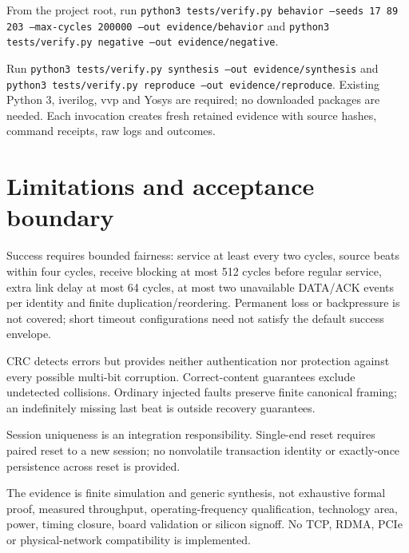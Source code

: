 \documentclass[11pt,a4paper]{article}
\begin{document}
From the project root,\allowbreak{} run \texttt{python3 tests/\allowbreak{}verify.py behavior --seeds 17 89 203 --max-cycles 200000 --out evidence/\allowbreak{}behavior} and \texttt{python3 tests/\allowbreak{}verify.py negative --out evidence/\allowbreak{}negative}.


Run \texttt{python3 tests/\allowbreak{}verify.py synthesis --out evidence/\allowbreak{}synthesis} and \texttt{python3 tests/\allowbreak{}verify.py reproduce --out evidence/\allowbreak{}reproduce}. Existing Python 3,\allowbreak{} iverilog,\allowbreak{} vvp and Yosys are required; no downloaded packages are needed. Each invocation creates fresh retained evidence with source hashes,\allowbreak{} command receipts,\allowbreak{} raw logs and outcomes.


\section{Limitations and acceptance boundary}

Success requires bounded fairness: service at least every two cycles,\allowbreak{} source beats within four cycles,\allowbreak{} receive blocking at most 512 cycles before regular service,\allowbreak{} extra link delay at most 64 cycles,\allowbreak{} at most two unavailable DATA/\allowbreak{}ACK events per identity and finite duplication/\allowbreak{}reordering. Permanent loss or backpressure is not covered; short timeout configurations need not satisfy the default success envelope.


CRC detects errors but provides neither authentication nor protection against every possible multi-bit corruption. Correct-content guarantees exclude undetected collisions. Ordinary injected faults preserve finite canonical framing; an indefinitely missing last beat is outside recovery guarantees.


Session uniqueness is an integration responsibility. Single-end reset requires paired reset to a new session; no nonvolatile transaction identity or exactly-once persistence across reset is provided.


The evidence is finite simulation and generic synthesis,\allowbreak{} not exhaustive formal proof,\allowbreak{} measured throughput,\allowbreak{} operating-frequency qualification,\allowbreak{} technology area,\allowbreak{} power,\allowbreak{} timing closure,\allowbreak{} board validation or silicon signoff. No TCP,\allowbreak{} RDMA,\allowbreak{} PCIe or physical-network compatibility is implemented.
\end{document}
